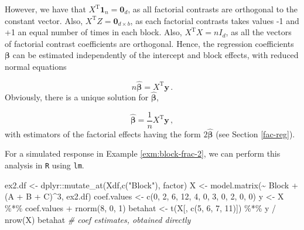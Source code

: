 \documentclass[
]{book}
\newenvironment{Shaded}{\begin{snugshade}}{\end{snugshade}}
\newcommand{\CommentTok}[1]{\textcolor[rgb]{0.56,0.35,0.01}{\textit{#1}}}
\newcommand{\DecValTok}[1]{\textcolor[rgb]{0.00,0.00,0.81}{#1}}
\newcommand{\FunctionTok}[1]{\textcolor[rgb]{0.00,0.00,0.00}{#1}}
\newcommand{\NormalTok}[1]{#1}
\newcommand{\OtherTok}[1]{\textcolor[rgb]{0.56,0.35,0.01}{#1}}
\newcommand{\SpecialCharTok}[1]{\textcolor[rgb]{0.00,0.00,0.00}{#1}}
\newcommand{\StringTok}[1]{\textcolor[rgb]{0.31,0.60,0.02}{#1}}
\theoremstyle{definition}
\theoremstyle{definition}
\theoremstyle{definition}
\theoremstyle{definition}
\theoremstyle{remark}
\begin{document}
However, we have that \(X^{\mathrm{T}}\boldsymbol{1}_n = \boldsymbol{0}_{d}\), as all factorial contrasts are orthogonal to the constant vector. Also, \(X^{\mathrm{T}}Z = \boldsymbol{0}_{d\times b}\), as each factorial contrasts takes values -1 and +1 an equal number of times in each block. Also, \(X^{\mathrm{T}}X = nI_{d}\), as all the vectors of factorial contrast coefficients are orthogonal. Hence, the regression coefficients \(\boldsymbol{\beta}\) can be estimated independently of the intercept and block effects, with reduced normal equations

\[
n\hat{\boldsymbol{\beta}} = X^{\mathrm{T}}\boldsymbol{y}\,.
\]
Obviously, there is a unique solution for \(\hat{\boldsymbol{\beta}}\),

\[
\hat{\boldsymbol{\beta}} = \frac{1}{n}X^{\mathrm{T}}\boldsymbol{y}\,,
\]
with estimators of the factorial effects having the form \(2\hat{\boldsymbol{\beta}}\) (see Section \ref{fac-reg}).

For a simulated response in Example \ref{exm:block-frac-2}, we can perform this analysis in \texttt{R} using \texttt{lm}.

\begin{Shaded}
\begin{Highlighting}[]
\NormalTok{ex2.df }\OtherTok{\textless{}{-}}\NormalTok{ dplyr}\SpecialCharTok{::}\FunctionTok{mutate\_at}\NormalTok{(Xdf,}\FunctionTok{c}\NormalTok{(}\StringTok{"Block"}\NormalTok{), factor)}
\NormalTok{X }\OtherTok{\textless{}{-}} \FunctionTok{model.matrix}\NormalTok{(}\SpecialCharTok{\textasciitilde{}}\NormalTok{ Block }\SpecialCharTok{+}\NormalTok{ (A }\SpecialCharTok{+}\NormalTok{ B }\SpecialCharTok{+}\NormalTok{ C)}\SpecialCharTok{\^{}}\DecValTok{3}\NormalTok{, ex2.df)}
\NormalTok{coef.values }\OtherTok{\textless{}{-}} \FunctionTok{c}\NormalTok{(}\DecValTok{0}\NormalTok{, }\DecValTok{2}\NormalTok{, }\DecValTok{6}\NormalTok{, }\DecValTok{12}\NormalTok{, }\DecValTok{4}\NormalTok{, }\DecValTok{0}\NormalTok{, }\DecValTok{3}\NormalTok{, }\DecValTok{0}\NormalTok{, }\DecValTok{2}\NormalTok{, }\DecValTok{0}\NormalTok{, }\DecValTok{0}\NormalTok{)}
\NormalTok{y }\OtherTok{\textless{}{-}}\NormalTok{ X }\SpecialCharTok{\%*\%}\NormalTok{ coef.values }\SpecialCharTok{+} \FunctionTok{rnorm}\NormalTok{(}\DecValTok{8}\NormalTok{, }\DecValTok{0}\NormalTok{, }\DecValTok{1}\NormalTok{)}
\NormalTok{betahat }\OtherTok{\textless{}{-}} \FunctionTok{t}\NormalTok{(X[, }\FunctionTok{c}\NormalTok{(}\DecValTok{5}\NormalTok{, }\DecValTok{6}\NormalTok{, }\DecValTok{7}\NormalTok{, }\DecValTok{11}\NormalTok{)]) }\SpecialCharTok{\%*\%}\NormalTok{ y }\SpecialCharTok{/} \FunctionTok{nrow}\NormalTok{(X)}
\NormalTok{betahat }\CommentTok{\# coef estimates, obtained directly}
\end{Highlighting}
\end{Shaded}
\end{document}
